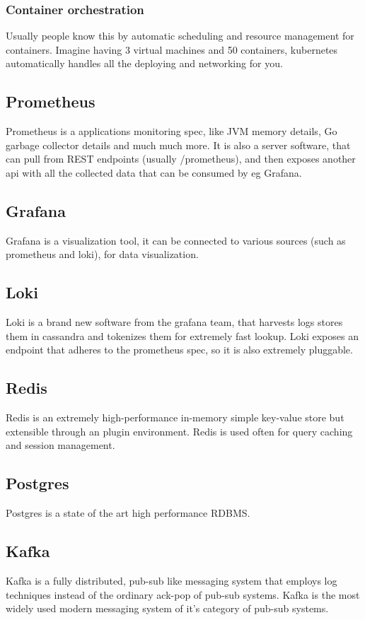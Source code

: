 \subsubsection{Container orchestration}
Usually people know this by automatic scheduling and resource management for containers.
Imagine having 3 virtual machines and 50 containers, kubernetes automatically handles all the deploying and networking for you.
\subsection{Prometheus}
Prometheus is a applications monitoring spec, like JVM memory details, Go garbage collector details and much much more.
It is also a server software, that can pull from REST endpoints (usually /prometheus), and then exposes another api with all the collected data that can be consumed by eg Grafana.
\subsection{Grafana}
Grafana is a visualization tool, it can be connected to various sources (such as prometheus and loki), for data visualization.
\subsection{Loki}
Loki is a brand new software from the grafana team, that harvests logs stores them in cassandra and tokenizes them for extremely fast lookup.
Loki exposes an endpoint that adheres to the prometheus spec, so it is also extremely pluggable.
\subsection{Redis}
Redis is an extremely high-performance in-memory simple key-value store but extensible through an plugin environment.
Redis is used often for query caching and session management.
\subsection{Postgres}
Postgres is a state of the art high performance RDBMS.
\subsection{Kafka}
Kafka is a fully distributed, pub-sub like messaging system that employs log techniques instead of the ordinary ack-pop of pub-sub systems.
Kafka is the most widely used modern messaging system of it's category of pub-sub systems.
